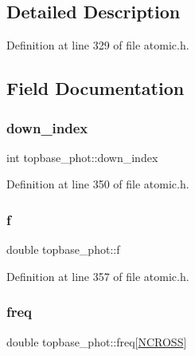 \subsection{Detailed Description}


Definition at line 329 of file atomic.\+h.



\subsection{Field Documentation}
\mbox{\label{structtopbase__phot_ae229323c0d16d0a56d3cbedd5700190f}} 
\subsubsection{\texorpdfstring{down\+\_\+index}{down\_index}}
{\footnotesize\ttfamily int topbase\+\_\+phot\+::down\+\_\+index}



Definition at line 350 of file atomic.\+h.

\mbox{\label{structtopbase__phot_acb68a1799ed2de5740faab1907342c6c}} 
\subsubsection{\texorpdfstring{f}{f}}
{\footnotesize\ttfamily double topbase\+\_\+phot\+::f}



Definition at line 357 of file atomic.\+h.

\mbox{\label{structtopbase__phot_a18d8d6eeb8df6e8ad2f89550c6b86310}} 
\subsubsection{\texorpdfstring{freq}{freq}}
{\footnotesize\ttfamily double topbase\+\_\+phot\+::freq\mbox{[}\hyperlink{atomic_8h_a9012fd4c06f8e07e4288a6c441c44b63}{N\+C\+R\+O\+SS}\mbox{]}}



